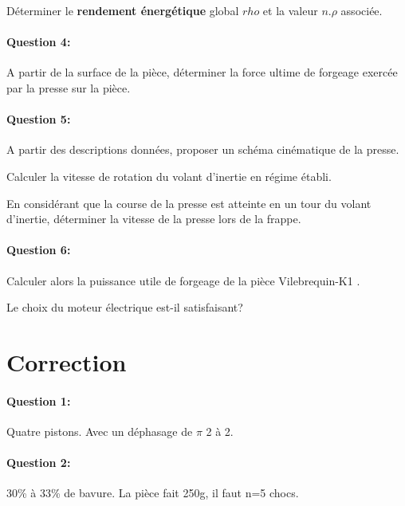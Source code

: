 Déterminer le \textbf{rendement énergétique} global $rho$ et la valeur $n.\rho$ associée.

\paragraph{Question 4:} A partir de la surface de la pièce, déterminer la force ultime de forgeage exercée par la presse sur la pièce.

\paragraph{Question 5:} A partir des descriptions données, proposer un schéma cinématique de la presse.

Calculer la vitesse de rotation du volant d'inertie en régime établi.

En considérant que la course de la presse est atteinte en un tour du volant d'inertie, déterminer la vitesse de la presse lors de la frappe.

\paragraph{Question 6:} Calculer alors la puissance utile de forgeage de la pièce \og Vilebrequin-K1 \fg.

Le choix du moteur électrique est-il satisfaisant?





\clearpage

\ifdef{\public}{}{}

\newpage

\pagestyle{correction}

\section{Correction}

\paragraph{Question 1:} Quatre pistons. Avec un déphasage de $\pi$ 2 à 2.

\paragraph{Question 2:} 30\% à 33\% de bavure. La pièce fait 250g, il faut n=5 chocs.


